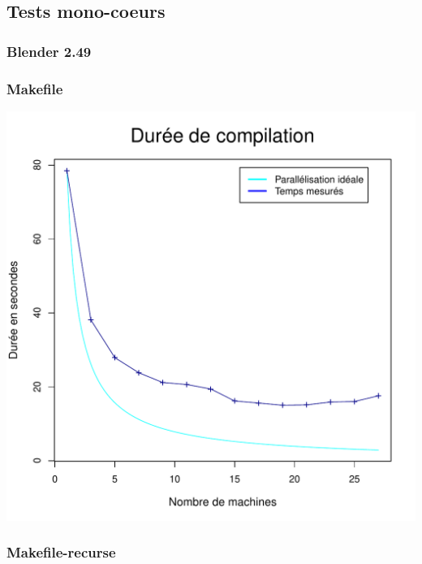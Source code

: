 \documentclass[a4paper, 11pt, titlepage]{article}
\begin{document}
\subsection {Tests mono-coeurs}




\subsubsection {Blender 2.49}
\subsubsection* {Makefile}

\begin{center}
    \includegraphics[scale=0.45]{res/sujet_makefiles_blender_249_Makefile_nth1.pdf}
\end{center}


\subsubsection* {Makefile-recurse}
\end{document}
